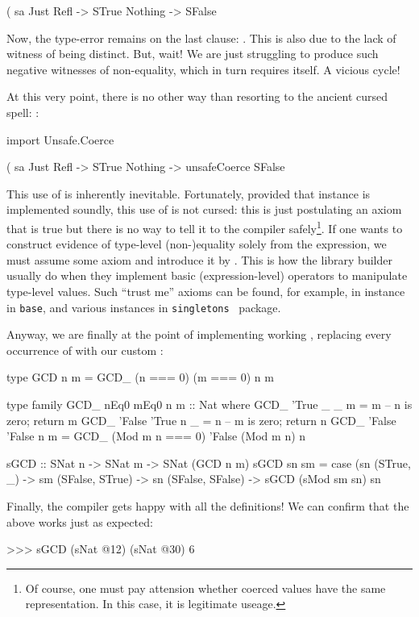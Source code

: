 \documentclass[demotion-paper.tex]{subfiles}
\begin{document}
\begin{code}
(%
sa %
  Just Refl -> STrue
  Nothing -> SFalse  
\end{code}

Now, the type-error remains on the last clause: .
This is also due to the lack of witness of being distinct.
But, wait! We are just struggling to produce such negative witnesses of non-equality, which in turn requires itself. A vicious cycle!

At this very point, there is no other way than resorting to the ancient cursed spell: :

\begin{code}
import Unsafe.Coerce

(%
sa %
  Just Refl -> STrue
  Nothing -> unsafeCoerce SFalse  
\end{code}

This use of  is inherently inevitable.
Fortunately, provided that  instance is implemented soundly, this use of  is not cursed: this is just postulating an axiom that is true but there is no way to tell it to the compiler safely\footnote{Of course, one must pay attension whether coerced values have the same representation. In this case, it is legitimate useage.}.
If one wants to construct evidence of type-level (non-)equality solely from the expression, we must assume some axiom and introduce it by .
This is how the library builder usually do when they implement basic (expression-level) operators to manipulate type-level values.
Such ``trust me'' axioms can be found, for example, in  instance in \texttt{base}, and various  instances in \texttt{singletons}~\cite{singletons} package.

Anyway, we are finally at the point of implementing working , replacing every occurrence of \hask{(==)} with our custom \hask{(===)}:

\begin{code}
type GCD n m = GCD_ (n === 0) (m === 0) n m

type family GCD_ nEq0 mEq0 n m :: Nat where
  GCD_ 'True  _      _ m = m -- n is zero; return m
  GCD_ 'False 'True  n _ = n -- m is zero; return n
  GCD_ 'False 'False n m = GCD_ (Mod m n === 0) 'False (Mod m n) n

sGCD :: SNat n -> SNat m -> SNat (GCD n m)
sGCD sn sm = case (sn %
  (STrue, _) -> sm
  (SFalse, STrue) -> sn
  (SFalse, SFalse) -> sGCD (sMod sm sn) sn
\end{code}

Finally, the compiler gets happy with all the definitions!
We can confirm that the above  works just as expected:
\begin{repl}
>>> sGCD (sNat @12) (sNat @30)
6
\end{repl}
\end{document}
